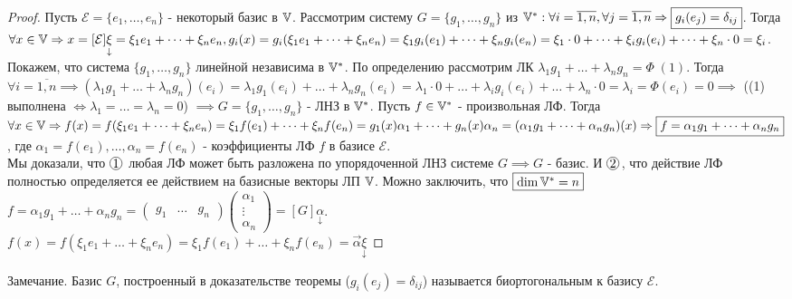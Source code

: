\documentclass[../main.tex]{subfiles}
\begin{document}
\begin{proof}
    Пусть $\mathcal{E}=\{e_{1},\dots,e_{n}\}$ - некоторый базис в $\mathbb{V}$. Рассмотрим систему $G = \{g_{1},\dots,g_{n}\}$ из $\mathbb{V}^{*}: \forall i=\overline{1,n}, \forall j =\overline{1,n}\Rightarrow \fbox{$g_{i}(e_{j}) = \delta_{ij}$}$. Тогда $\forall x\in\mathbb{V} \Rightarrow x = [\mathcal{E}]\underset{\downarrow}{\xi} = \xi_{1}e_{1}+\dots+\xi_{n}e_{n}, g_{i}(x)= g_{i}(\xi_{1}e_{1}+\dots+\xi_{n}e_{n}) = \xi_{1}g_{i}(e_{1})+\dots+\xi_{n}g_{i}(e_{n}) = \xi_{1}\cdot 0 + \dots + \xi_{i}g_{i}(e_{i})+\dots+\xi_{n}\cdot 0 = \xi_{i}$. Покажем, что система $\{g_{1},\dots,g_{n}\}$ линейной независима в $\mathbb{V}^{*}$. По определению рассмотрим ЛК $\lambda_{1}g_{1}+\dots+\lambda_{n}g_{n} = \varPhi\;(1)$. Тогда $\forall i=\overline{1,n}\implies (\lambda_{1}g_{1}+\dots+\lambda_{n}g_{n})(e_{i}) = \lambda_{1}g_{1}(e_{i})+\dots+\lambda_{n}g_{n}(e_{i}) = \lambda_{1}\cdot 0 + \dots + \lambda_{i}g_{i}(e_{i})+\dots+\lambda_{n}\cdot 0 = \lambda_{i} = \varPhi (e_{i}) = 0\implies  $ ((1) выполнена $\Leftrightarrow \lambda_{1}=\dots=\lambda_{n}=0$) $\implies G = \{g_{1},\dots,g_{n}\}$ - ЛНЗ в $\mathbb{V}^{*}$. 
    Пусть $f\in\mathbb{V}^{*} $ - произвольная ЛФ. Тогда $\forall x \in \mathbb{V} \Rightarrow f(x) = f(\xi_{1}e_{1}+\dots+\xi_{n}e_{n}) = \xi_{1}f(e_{1})+\dots+\xi_{n}f(e_{n}) = g_{1}(x)\alpha_{1}+ \dots + g_{n}(x)\alpha_{n} = (\alpha_{1}g_{1} + \dots+ \alpha_{n}g_{n})(x)\Rightarrow \fbox{$f= \alpha_{1}g_{1}+\dots+\alpha_{n}g_{n}$}$, где $\alpha_{1} = f(e_{1}),\dots,\alpha_{n} = f(e_{n})$ - коэффициенты ЛФ $f$ в базисе $\mathcal{E}$. 
    \\Мы доказали, что $\tcircle{1}\;$ любая ЛФ может быть разложена по упорядоченной ЛНЗ системе $G\implies G$ - базис. И $\tcircle{2}\;$, что действие ЛФ полностью определяется ее действием на базисные векторы ЛП $\mathbb{V}$. Можно заключить, что $\fbox{$\dim \mathbb{V}^{*} = n$}$\; $f= \alpha_{1}g_{1}+\dots+\alpha_{n}g_{n}=\begin{pmatrix}
        g_{1}&\dots&g_{n}
    \end{pmatrix} \begin{pmatrix} {\alpha}_{1}\\ \vdots\\ {\alpha}_{n} \end{pmatrix}  = [G]\underset{\downarrow}{\alpha}$.
    \\$f(x)=f(\xi_{1}e_{1}+\dots+\xi_{n}e_{n}) = \xi_{1}f(e_{1})+\dots+\xi_{n}f(e_{n}) = \vec{\alpha}\underset{\downarrow}{\xi}$

\end{proof}
Замечание. Базис $G$, построенный в доказательстве теоремы ($g_{i}(e_{j})=\delta_{ij}$) называется биортогональным к базису $\mathcal{E}$. 
\end{document}
